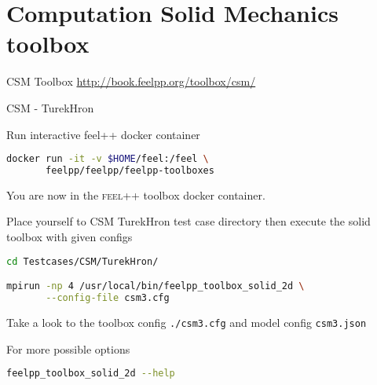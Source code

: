 








\section[CSM]{Computation Solid Mechanics toolbox}

\begin{frame}[standout]{CSM Toolbox}
  \url{http://book.feelpp.org/toolbox/csm/}
\end{frame}


\begin{frame}{CSM - TurekHron}

Run  interactive feel++ docker container

\begin{lstlisting}[language=Bash,mathescape=false,emph={docker}]
docker run -it -v $HOME/feel:/feel \
       feelpp/feelpp/feelpp-toolboxes
\end{lstlisting}

You are now in the \textsc{feel++} toolbox docker container.

Place yourself to CSM TurekHron test case directory then execute the
solid toolbox with given configs

\begin{lstlisting}[language=Bash,mathescape=false, emph={feelpp_toolbox_solid_2d}]
cd Testcases/CSM/TurekHron/

mpirun -np 4 /usr/local/bin/feelpp_toolbox_solid_2d \
       --config-file csm3.cfg
\end{lstlisting}

Take a look to the toolbox config \lstinline{./csm3.cfg} and model config
\lstinline{csm3.json}

For more possible options
\begin{lstlisting}[language=Bash,mathescape=false, emph={feelpp_toolbox_solid_2d}]
feelpp_toolbox_solid_2d --help
\end{lstlisting}

\end{frame}




